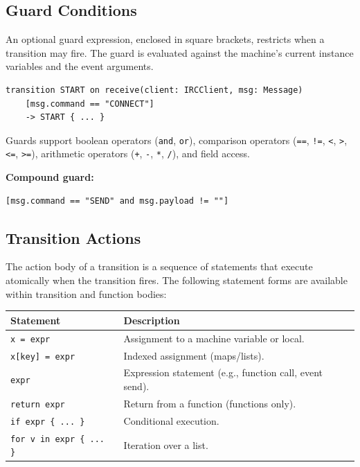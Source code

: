 \documentclass[11pt,letterpaper]{article}
\begin{document}
\subsection{Guard Conditions}
\label{sec:guards}

An optional guard expression, enclosed in square brackets, restricts
when a transition may fire.  The guard is evaluated against the machine's
current instance variables and the event arguments.

\begin{lstlisting}[numbers=none]
transition START on receive(client: IRCClient, msg: Message)
    [msg.command == "CONNECT"]
    -> START { ... }
\end{lstlisting}

Guards support boolean operators (\lstinline{and}, \lstinline{or}),
comparison operators (\lstinline{==}, \lstinline{!=}, \lstinline{<},
\lstinline{>}, \lstinline{<=}, \lstinline{>=}), arithmetic operators
(\lstinline{+}, \lstinline{-}, \lstinline{*}, \lstinline{/}), and
field access.

\textbf{Compound guard:}
\begin{lstlisting}[numbers=none]
[msg.command == "SEND" and msg.payload != ""]
\end{lstlisting}

\subsection{Transition Actions}
\label{sec:actions}

The action body of a transition is a sequence of statements that execute
atomically when the transition fires.  The following statement forms are
available within transition and function bodies:

\begin{longtable}{@{}p{3.6cm}p{9cm}@{}}
\toprule
\textbf{Statement} & \textbf{Description} \\
\midrule
\texttt{x = expr} & Assignment to a machine variable or local. \\
\texttt{x[key] = expr} & Indexed assignment (maps/lists). \\
\texttt{expr} & Expression statement (e.g., function call, event send). \\
\texttt{return expr} & Return from a function (functions only). \\
\texttt{if expr \{ ... \}} & Conditional execution. \\
\texttt{for v in expr \{ ... \}} & Iteration over a list. \\
\bottomrule
\end{longtable}
\end{document}
